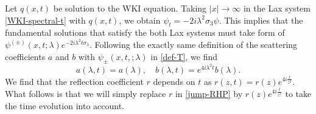 \documentclass[11pt]{article}
\begin{document}
Let $q(x,t)$ be solution to the WKI equation. Taking $|x|\rightarrow \infty$ in the Lax system \eqref{WKI-spectral-t} with $q(x,t)$, we obtain $\psi_t=-2i\lambda^2\sigma_3\psi$. This implies that the fundamental solutions that satisfy the both Lax systems must take form of $\psi^{(\pm)}(x,t;\lambda)e^{-2i\lambda^2t\sigma_3}$. Following the exactly same definition of the scattering coefficients $a$ and $b$ with $\psi_{\pm}(x,t,;\lambda)$ in \eqref{def-T}, we find 
\begin{equation} \label{a-b-time}
a(\lambda,t)=a(\lambda), \quad b(\lambda,t)=e^{4i\lambda^2t}b(\lambda).
\end{equation}
We find that the reflection coefficient $r$ depends on $t$ as $r(z,t)=r(z)e^{4i\frac{t}{z^2}}.$ What follows is that we will simply replace $r$ in \eqref{jump-RHP} by $r(z)e^{4i\frac{t}{z^2}}$ to take the time evolution into account. 
 
\end{document}
